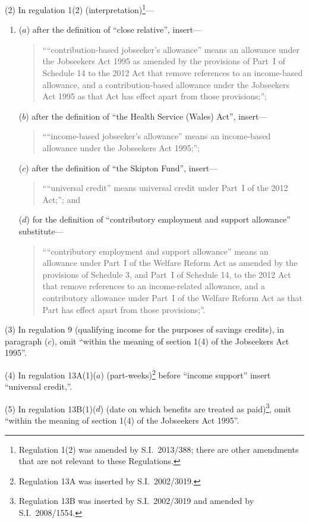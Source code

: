 \documentclass[12pt,a4paper]{article}
\begin{document}
(2) In regulation 1(2) (interpretation)\footnote{Regulation 1(2) was amended by S.I.~2013/388; there are other amendments that are not relevant to these Regulations.}—
\begin{enumerate}\item[]
($a$) after the definition of “close relative”, insert—
\begin{quotation}
““contribution-based jobseeker’s allowance” means an allowance under the Jobseekers Act 1995 as amended by the provisions of Part~I of Schedule 14 to the 2012 Act that remove references to an income-based allowance, and a contribution-based allowance under the Jobseekers Act 1995 as that Act has effect apart from those provisions;”;
\end{quotation}

($b$) after the definition of “the Health Service (Wales) Act”, insert—
\begin{quotation}
““income-based jobseeker’s allowance” means an income-based allowance under the Jobseekers 
Act 1995;”;
\end{quotation}

($c$) after the definition of “the Skipton Fund”, insert—
\begin{quotation}
““universal credit” means universal credit under Part~I of the 2012 Act;”; and
\end{quotation}

($d$) for the definition of “contributory employment and support allowance” substitute—
\begin{quotation}
““contributory employment and support allowance” means an allowance under Part~I of the Welfare Reform Act as amended by the provisions of Schedule 3, and Part~I of Schedule 14, to the 2012 Act that remove references to an income-related allowance, and a contributory allowance under Part~I of the Welfare Reform Act as that Part has effect apart from those provisions;”.
\end{quotation}
\end{enumerate}

(3) In regulation 9 (qualifying income for the purposes of savings credits), in paragraph ($c$), omit “within the meaning of section 1(4) of the Jobseekers Act 1995”.

(4) In regulation 13A(1)($a$)  (part-weeks)\footnote{Regulation 13A was inserted by S.I.~2002/3019.} before “income support” insert “universal credit,”.

(5) In regulation 13B(1)($d$)  (date on which benefits are treated as paid)\footnote{Regulation 13B was inserted by S.I.~2002/3019 and amended by S.I.~2008/1554.}, omit “within the meaning of section 1(4) of the Jobseekers Act 1995”.
\end{document}
